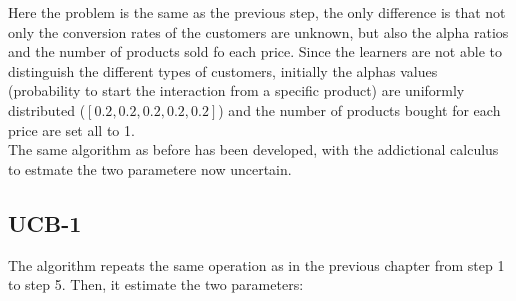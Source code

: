 Here the problem is the same as the previous step, the only difference is that not only the conversion rates of the customers are unknown, but also the alpha ratios and the number of products sold fo each price.
Since the learners are not able to distinguish the different types of customers, initially the alphas values (probability to start the interaction from a specific product) are uniformly distributed ($[0.2, 0.2, 0.2, 0.2, 0.2]$) and the number of products bought for each price are set all to 1.\\
The same algorithm as before has been developed, with the addictional calculus to estmate the two parametere now uncertain.

\subsection{UCB-1}
The algorithm repeats the same operation as in the previous chapter from step 1 to step 5. Then, it estimate the two parameters:

